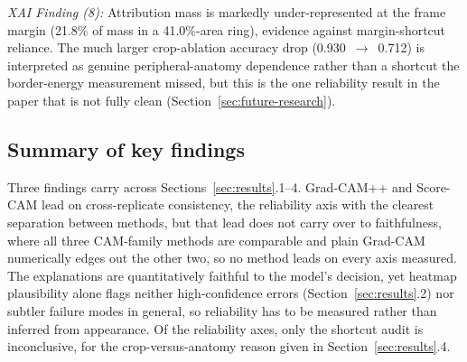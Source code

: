 \textit{XAI Finding (8):} Attribution mass is markedly under-represented at the frame margin (21.8\% of mass in a 41.0\%-area ring), evidence against margin-shortcut reliance. The much larger crop-ablation accuracy drop (0.930~$\rightarrow$~0.712) is interpreted as genuine peripheral-anatomy dependence rather than a shortcut the border-energy measurement missed, but this is the one reliability result in the paper that is not fully clean (Section~\ref{sec:future-research}).

\subsection{Summary of key findings}

Three findings carry across Sections~\ref{sec:results}.1--4. Grad-CAM++ and Score-CAM lead on cross-replicate consistency, the reliability axis with the clearest separation between methods, but that lead does not carry over to faithfulness, where all three CAM-family methods are comparable and plain Grad-CAM numerically edges out the other two, so no method leads on every axis measured. The explanations are quantitatively faithful to the model's decision, yet heatmap plausibility alone flags neither high-confidence errors (Section~\ref{sec:results}.2) nor subtler failure modes in general, so reliability has to be measured rather than inferred from appearance. Of the reliability axes, only the shortcut audit is inconclusive, for the crop-versus-anatomy reason given in Section~\ref{sec:results}.4.

